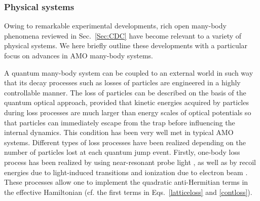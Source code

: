 \documentclass{tADP2e}
\theoremstyle{plain}
\theoremstyle{plain}
\theoremstyle{definition}
\begin{document}
\subsubsection{Physical systems}
\label{Sec:PS}
Owing to remarkable experimental developments, 
rich open many-body phenomena reviewed in Sec.~\ref{Sec:CDC} have become relevant to a variety of physical systems. We here briefly outline these developments with a particular focus on advances in AMO many-body systems.

A quantum many-body system can be coupled to an external world in such way that its decay processes such as losses of particles are engineered in a highly controllable manner. The loss of particles can be described on the basis of the quantum optical approach, provided that kinetic energies acquired by particles during loss processes are much larger than energy scales of optical potentials so that particles can immediately escape from the trap before influencing the internal dynamics. This condition has been very well met in typical AMO systems.  
 Different types of loss processes have been realized depending on the number of particles lost at each quantum jump event. Firstly, one-body loss process has been realized by using near-resonant probe light  \cite{KSJ98,MKO99,AT03,RS05,YA17nc,LHP17}, as well as by recoil energies due to light-induced transitions \cite{BWS09,RB16} and ionization due to electron beam \cite{GT08,WP09,BG13,LR16}.
 These processes allow one to implement \cite{BP11,WD11,VI14,YT20}  the quadratic anti-Hermitian terms in the effective Hamiltonian (cf. the first terms in Eqs.~\eqref{latticeloss} and \eqref{contloss}). 
 
\end{document}
